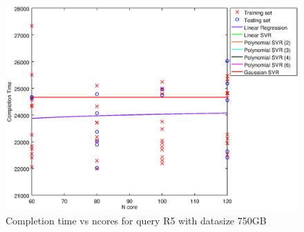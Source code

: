 
\begin {figure}[hbtp]
\centering
\includegraphics[width=\textwidth]{output/R5_750_ONLY_1_OVER_NCORES/plot_R5_750.eps}
\caption{Completion time vs ncores for query R5 with datasize 750GB}
\label{fig:all_nonlinear_R5_750}
\end {figure}
